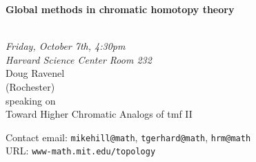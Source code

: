 \documentclass{slides}
\begin{document}
\begin{center}

{\fontsize {54pt}{40pt}\selectfont

\textrm{
{\textbf{Global methods in chromatic homotopy theory}}}
}\\
\vspace{1cm}
{\large\textrm{\emph{Friday, October 7th, 4:30pm\\Harvard Science Center Room 232}}}\\
\vspace{1cm}
\textrm{{\LARGE Doug Ravenel  \\[.5cm](Rochester)}}\\
\vspace{1cm} %
\textrm{speaking on}\\ %
\vspace{5mm}
\textrm{{\LARGE Toward Higher Chromatic Analogs of tmf II}}\\
\end{center}
\vspace{1cm}
{\small

\textrm{Contact email: } \texttt{mikehill@math}, \texttt{tgerhard@math},
\texttt{hrm@math}\\
\textrm{URL: } \texttt{www-math.mit.edu/topology}
}
\end{document}
